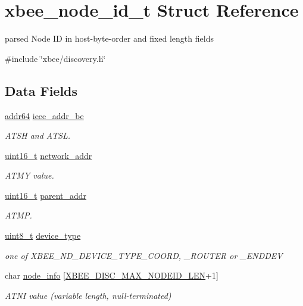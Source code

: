 \hypertarget{structxbee__node__id__t}{}\section{xbee\+\_\+node\+\_\+id\+\_\+t Struct Reference}
\label{structxbee__node__id__t}


parsed Node ID in host-\/byte-\/order and fixed length fields  




{\ttfamily \#include \char`\"{}xbee/discovery.\+h\char`\"{}}

\subsection*{Data Fields}
\begin{DoxyCompactItemize}
\item 
\hyperlink{unionaddr64}{addr64} \hyperlink{group__xbee__discovery_ga719f89263ecae9f127dc655c1c14fdac}{ieee\+\_\+addr\+\_\+be}
\begin{DoxyCompactList}\small\item\em A\+T\+SH and A\+T\+SL. \end{DoxyCompactList}\item 
\hyperlink{group__hal__dos_ga5a8b2dc9e45a9ee81a94ef304fb62505}{uint16\+\_\+t} \hyperlink{group__xbee__discovery_gac1fa8be8752da585fe6a567d4732c147}{network\+\_\+addr}
\begin{DoxyCompactList}\small\item\em A\+T\+MY value. \end{DoxyCompactList}\item 
\hyperlink{group__hal__dos_ga5a8b2dc9e45a9ee81a94ef304fb62505}{uint16\+\_\+t} \hyperlink{group__xbee__discovery_ga300e014f0c31d08adc1145613e0b0f72}{parent\+\_\+addr}
\begin{DoxyCompactList}\small\item\em A\+T\+MP. \end{DoxyCompactList}\item 
\hyperlink{group__hal__dos_gae1affc9ca37cfb624959c866a73f83c2}{uint8\+\_\+t} \hyperlink{group__xbee__discovery_gab9c960832b7e834e6657e0c6ab4c3d8a}{device\+\_\+type}
\begin{DoxyCompactList}\small\item\em one of X\+B\+E\+E\+\_\+\+N\+D\+\_\+\+D\+E\+V\+I\+C\+E\+\_\+\+T\+Y\+P\+E\+\_\+\+C\+O\+O\+RD, \+\_\+\+R\+O\+U\+T\+ER or \+\_\+\+E\+N\+D\+D\+EV \end{DoxyCompactList}\item 
char \hyperlink{group__xbee__discovery_gaa667bab3abb953bc14d9f5bcc36644b8}{node\+\_\+info} \mbox{[}\hyperlink{group__xbee__discovery_ga0df6e63d6ccca22fcf154b6f0be46da6}{X\+B\+E\+E\+\_\+\+D\+I\+S\+C\+\_\+\+M\+A\+X\+\_\+\+N\+O\+D\+E\+I\+D\+\_\+\+L\+EN}+1\mbox{]}
\begin{DoxyCompactList}\small\item\em A\+T\+NI value (variable length, null-\/terminated) \end{DoxyCompactList}\end{DoxyCompactItemize}


